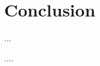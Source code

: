 \documentclass[
    reprint, 
    aps,
    preprintnumbers,
    twocolumn,
    prb,
    superscriptaddress
]{revtex4-2}
\begin{document}

\section{Conclusion}\label{sec:conclusion}

...


\begin{acknowledgments} 
    ....
\end{acknowledgments}


%
		
\end{document}
